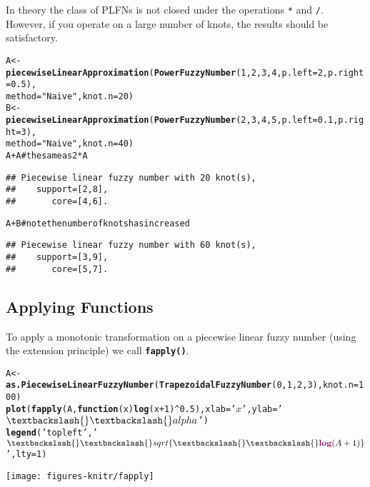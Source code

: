 \documentclass[11pt]{article}\usepackage{graphicx, color}
\makeatletter
\newcommand{\hlfunctioncall}[1]{\textcolor[rgb]{0.501960784313725,0,0.329411764705882}{\textbf{#1}}}%
\newcommand{\hlstring}[1]{\textcolor[rgb]{0.6,0.6,1}{#1}}%
\newcommand{\hlcomment}[1]{\textcolor[rgb]{0.180392156862745,0.6,0.341176470588235}{#1}}%
\newenvironment{kframe}{%
 \def\at@end@of@kframe{}%
 \ifinner\ifhmode%
  \def\at@end@of@kframe{\end{minipage}}%
  \begin{minipage}{\columnwidth}%
 \fi\fi%
 \def\FrameCommand##1{\hskip\@totalleftmargin \hskip-\fboxsep
 \colorbox{shadecolor}{##1}\hskip-\fboxsep
     \hskip-\linewidth \hskip-\@totalleftmargin \hskip\columnwidth}%
 \MakeFramed {\advance\hsize-\width
   \@totalleftmargin\z@ \linewidth\hsize
   \@setminipage}}%
 {\par\unskip\endMakeFramed%
 \at@end@of@kframe}
\newenvironment{knitrout}{}{} %
\newcommand{\func}[1]{\texttt{\hlfunctioncall{#1}}}
\makeatother
\begin{document}
In theory the class of PLFNs is not closed
under the operations \texttt{*} and \texttt{/}.
However, if you operate on a large number of knots,
the results should be satisfactory.



\begin{knitrout}\small
{}\color{fgcolor}\begin{kframe}
\begin{alltt}
A <- \hlfunctioncall{piecewiseLinearApproximation}(\hlfunctioncall{PowerFuzzyNumber}(1,2,3,4,p.left=2,p.right=0.5),
   method=\hlstring{"Naive"}, knot.n=20)
B <- \hlfunctioncall{piecewiseLinearApproximation}(\hlfunctioncall{PowerFuzzyNumber}(2,3,4,5,p.left=0.1,p.right=3),
   method=\hlstring{"Naive"}, knot.n=40)
A+A \hlcomment{# the same as 2*A}
\end{alltt}
\begin{verbatim}
## Piecewise linear fuzzy number with 20 knot(s),
##    support=[2,8],
##       core=[4,6].
\end{verbatim}
\begin{alltt}
A+B \hlcomment{# note the number of knots has increased}
\end{alltt}
\begin{verbatim}
## Piecewise linear fuzzy number with 60 knot(s),
##    support=[3,9],
##       core=[5,7].
\end{verbatim}
\end{kframe}
\end{knitrout}




\subsection{Applying Functions}


To apply a monotonic transformation on a piecewise linear fuzzy number
(using the extension principle) we call \func{fapply()}.

\begin{knitrout}\small
{}\color{fgcolor}\begin{kframe}
\begin{alltt}
A <- \hlfunctioncall{as.PiecewiseLinearFuzzyNumber}(\hlfunctioncall{TrapezoidalFuzzyNumber}(0,1,2,3), knot.n=100)
\hlfunctioncall{plot}(\hlfunctioncall{fapply}(A, \hlfunctioncall{function}(x) \hlfunctioncall{log}(x+1)^0.5), xlab=\hlstring{'$x$'}, ylab=\hlstring{'$\textbackslash{}\textbackslash{}alpha$'})
\hlfunctioncall{legend}(\hlstring{'topleft'}, \hlstring{'$\textbackslash{}\textbackslash{}sqrt\{\textbackslash{}\textbackslash{}\hlfunctioncall{log}(A+1)\}$'}, lty=1)
\end{alltt}
\end{kframe}

{\centering \texttt{[image: figures-knitr/fapply]} 

}



\end{knitrout}
\end{document}
